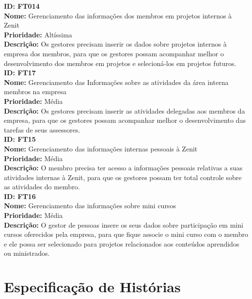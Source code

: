 \begin{anexosenv}
\indent \textbf{ID: FT014}\\
\indent \textbf{Nome: }Gerenciamento das informações dos membros em projetos internos à Zenit\\
\indent \textbf{Prioridade:} Altíssima\\
\indent \textbf{Descrição:} Os gestores precisam inserir os dados sobre projetos internos à empresa dos membros, para que os gestores possam acompanhar melhor o desenvolvimento dos membros em projetos e selecioná-los em projetos futuros.\\

\indent \textbf{ID: FT17}\\
\indent \textbf{Nome: }Gerenciamento das Informações sobre as atividades da área interna membros na empresa\\
\indent \textbf{Prioridade:} Média\\
\indent \textbf{Descrição:} Os gestores precisam inserir as atividades delegadas aos membros da empresa, para que os gestores possam acompanhar melhor o desenvolvimento das tarefas de seus assessores.\\

\indent \textbf{ID: FT15}\\
\indent \textbf{Nome:} Gerenciamento das informações internas pessoais à Zenit\\
\indent \textbf{Prioridade:} Média\\
\indent \textbf{Descrição:} O membro precisa ter acesso a informações pessoais relativas a suas atividades internas à Zenit, para que os gestores possam ter total controle sobre as atividades do membro.\\

\indent \textbf{ID: FT16}\\
\indent \textbf{Nome:} Gerenciamento das informações sobre mini cursos\\
\indent \textbf{Prioridade:} Média\\
\indent \textbf{Descrição:} O gestor de pessoas insere os seus dados sobre participação em mini cursos oferecidos pela empresa, para que fique associe o mini curso com o membro e ele possa ser selecionado para projetos relacionados aos conteúdos aprendidos ou ministrados.\\

\chapter[Especifica{\c c}{\~o}es de Hist{\'o}rias]{Especificação de Histórias}\label{especUs}


\end{anexosenv}
